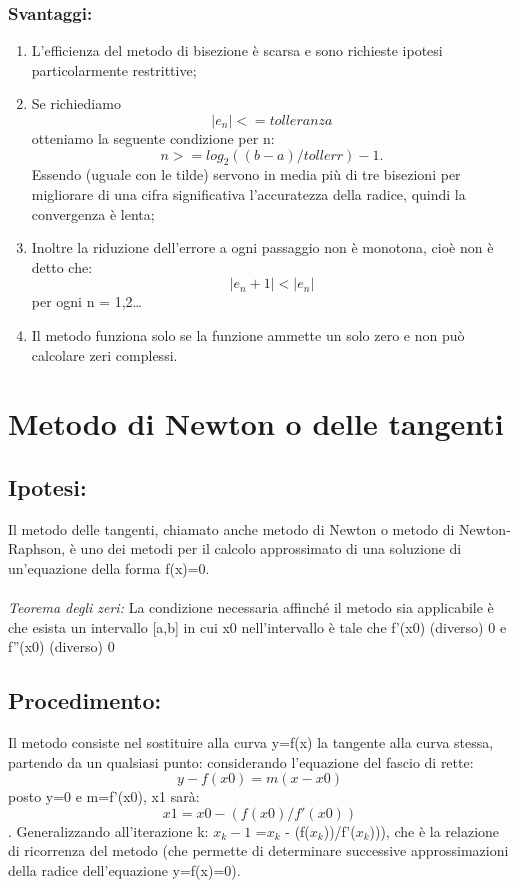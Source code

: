 \documentclass[a4paper,11pt]{article}
\begin{document}
\subsubsection{Svantaggi:}
\begin {enumerate}
\item L'efficienza del metodo di bisezione è scarsa e sono richieste ipotesi particolarmente restrittive;
\item Se richiediamo \begin {equation}|e_n| <= tolleranza  \end {equation}otteniamo la seguente condizione per n:
\begin{equation}	n >= log_2 ((b-a) / tollerr) - 1. \end{equation}
Essendo  %
 (uguale con le tilde) servono in media più di tre bisezioni per migliorare di una cifra significativa l'accuratezza della radice, quindi la convergenza è  lenta;
\item Inoltre la riduzione dell'errore a ogni passaggio non è monotona, cioè non è detto che:  \begin {equation}|e_n+1| < |e_n | \end{equation}per ogni n = 1,2\dots
\item Il metodo funziona solo se la funzione ammette un solo zero e non può calcolare zeri complessi.
\end{enumerate}
\section {Metodo di Newton o delle tangenti}
\subsection{Ipotesi:}
Il metodo delle tangenti, chiamato anche metodo di Newton o metodo di Newton-Raphson, è uno dei metodi per il calcolo approssimato di una soluzione di 		un'equazione della forma f(x)=0.
\\
\\
\textit{Teorema degli zeri:}
La condizione necessaria affinché il metodo sia applicabile è che esista un intervallo [a,b] in cui x0 nell'intervallo è tale che f'(x0) (diverso) 0 e f''(x0) (diverso) 0 		
\subsection{Procedimento:}
Il metodo consiste nel sostituire alla curva y=f(x) la tangente alla curva stessa, partendo da un qualsiasi punto: considerando l’equazione del fascio di rette:
\begin{equation} y-f(x0)=m(x-x0)\end{equation} posto y=0 e m=f'(x0), x1 sarà:\begin{equation} x1=x0-(f(x0)/f'(x0)) \end{equation}.
Generalizzando all’iterazione k: $x_k-1$ =$x_k$ - (f($x_k$))/f'($x_k$))), che è la relazione di ricorrenza del metodo (che permette di determinare successive 	approssimazioni della radice dell'equazione y=f(x)=0).
\end{document}

